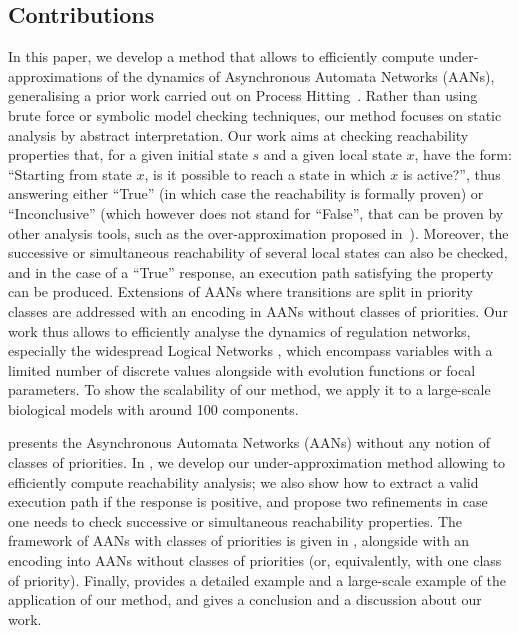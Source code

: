 \subsection*{Contributions}
In this paper, we develop a method
that allows to efficiently compute under-approximations of the dynamics
of Asynchronous Automata Networks (AANs),
generalising a prior work carried out on Process Hitting~\cite{PMR12-MSCS}.
Rather than using brute force or symbolic model checking techniques,
our method focuses on static analysis by abstract interpretation.
Our work aims at checking reachability properties that,
for a given initial state $s$ and a given local state $x$,
have the form:
“Starting from state $x$, is it possible to reach
a state in which $x$ is active?”,
thus answering either “True”
(in which case the reachability is formally proven)
or “Inconclusive”
(which however does not stand for “False”, that can be proven by other analysis tools,
such as the over-approximation proposed in~\cite{PMR12-MSCS}).
Moreover, the successive or simultaneous reachability of several local states
can also be checked,
and in the case of a “True” response,
an execution path satisfying the property can be produced.
Extensions of AANs where transitions are split in priority classes are addressed with an encoding in
AANs without classes of priorities.
Our work thus allows to efficiently analyse the dynamics
of regulation networks,
especially the widespread Logical Networks \cite{Thomas95,deJong02},
which encompass variables with a limited number of discrete values
alongside with evolution functions or focal parameters.
To show the scalability of our method, we apply it to a
large-scale biological models with around 100 components.

 presents the Asynchronous Automata Networks (AANs)
without any notion of classes of priorities.
In ,
we develop our under-approximation method allowing to efficiently
compute reachability analysis;
we also show how to extract a valid execution path if the response is positive,
and propose two refinements in case one needs to check
successive or simultaneous reachability properties.
The framework of AANs with classes of priorities is given in ,
alongside with an encoding into AANs without classes of priorities
(or, equivalently, with one class of priority).
Finally,  provides a detailed example and a large-scale example
of the application of our method,
and  gives a conclusion and a discussion about our work.

